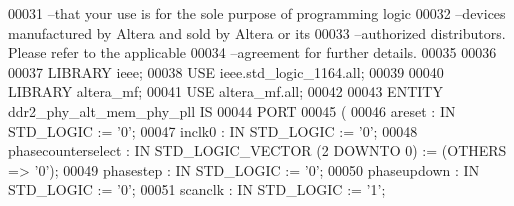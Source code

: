 \begin{DoxyCode}
{00031 \textcolor{keyword}{--that your use is for the sole purpose of programming logic }
00032 \textcolor{keyword}{--devices manufactured by Altera and sold by Altera or its }
00033 \textcolor{keyword}{--authorized distributors.  Please refer to the applicable }
00034 \textcolor{keyword}{--agreement for further details.}
00035 
00036 
00037 \textcolor{vhdlkeyword}{LIBRARY }\textcolor{keywordflow}{ieee};
00038 \textcolor{vhdlkeyword}{USE }ieee.std\_logic\_1164.\textcolor{keywordflow}{all};
00039 
00040 \textcolor{vhdlkeyword}{LIBRARY }\textcolor{keywordflow}{altera\_mf};
00041 \textcolor{vhdlkeyword}{USE }\textcolor{keywordflow}{altera\_mf.all};
00042 
00043 \textcolor{keywordflow}{ENTITY }ddr2_phy_alt_mem_phy_pll \textcolor{keywordflow}{IS}
00044     \textcolor{keywordflow}{PORT}
00045     \textcolor{vhdlchar}{(}
00046         \textcolor{vhdlchar}{areset}      \textcolor{vhdlchar}{:} \textcolor{keywordflow}{IN} \textcolor{comment}{STD\_LOGIC}  \textcolor{vhdlchar}{:=} \textcolor{vhdlchar}{'}\textcolor{vhdllogic}{}\textcolor{vhdllogic}{0}\textcolor{vhdlchar}{'};
00047         \textcolor{vhdlchar}{inclk0}      \textcolor{vhdlchar}{:} \textcolor{keywordflow}{IN} \textcolor{comment}{STD\_LOGIC}  \textcolor{vhdlchar}{:=} \textcolor{vhdlchar}{'}\textcolor{vhdllogic}{}\textcolor{vhdllogic}{0}\textcolor{vhdlchar}{'};
00048         \textcolor{vhdlchar}{phasecounterselect}      \textcolor{vhdlchar}{:} \textcolor{keywordflow}{IN} \textcolor{comment}{STD\_LOGIC\_VECTOR} \textcolor{vhdlchar}{(}\textcolor{vhdllogic}{}\textcolor{vhdllogic}{2} \textcolor{keywordflow}{DOWNTO} \textcolor{vhdllogic}{}\textcolor{vhdllogic}{0}\textcolor{vhdlchar}{)} \textcolor{vhdlchar}{:=}  \textcolor{vhdlchar}{(}\textcolor{keywordflow}{OTHERS} \textcolor{vhdlchar}{=}\textcolor{vhdlchar}{>} \textcolor{vhdlchar}{'}\textcolor{vhdllogic}{}\textcolor{vhdllogic}{0}\textcolor{vhdlchar}{'}\textcolor{vhdlchar}{)};
00049         \textcolor{vhdlchar}{phasestep}       \textcolor{vhdlchar}{:} \textcolor{keywordflow}{IN} \textcolor{comment}{STD\_LOGIC}  \textcolor{vhdlchar}{:=} \textcolor{vhdlchar}{'}\textcolor{vhdllogic}{}\textcolor{vhdllogic}{0}\textcolor{vhdlchar}{'};
00050         \textcolor{vhdlchar}{phaseupdown}     \textcolor{vhdlchar}{:} \textcolor{keywordflow}{IN} \textcolor{comment}{STD\_LOGIC}  \textcolor{vhdlchar}{:=} \textcolor{vhdlchar}{'}\textcolor{vhdllogic}{}\textcolor{vhdllogic}{0}\textcolor{vhdlchar}{'};
00051         \textcolor{vhdlchar}{scanclk}     \textcolor{vhdlchar}{:} \textcolor{keywordflow}{IN} \textcolor{comment}{STD\_LOGIC}  \textcolor{vhdlchar}{:=} \textcolor{vhdlchar}{'}\textcolor{vhdllogic}{}\textcolor{vhdllogic}{1}\textcolor{vhdlchar}{'};
}
\end{DoxyCode}
